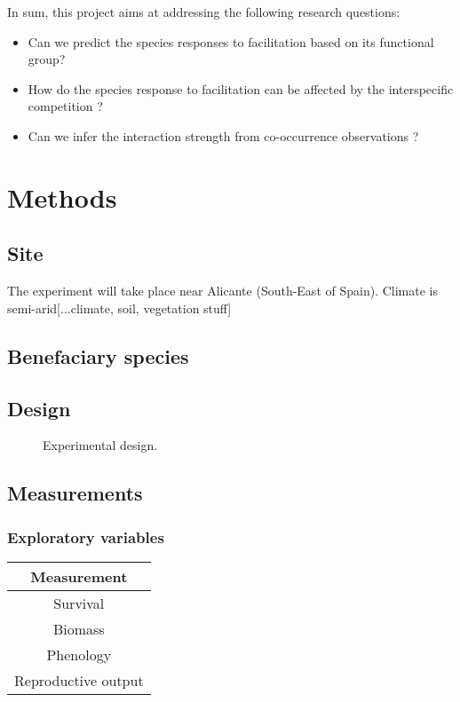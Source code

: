 \documentclass[12pt, a4paper]{article} %
\begin{document}
In sum, this project aims at addressing the following research questions:
\begin{itemize}
	\item Can we predict the species responses to facilitation based on its functional group? 
	\item How do the species response to facilitation can be affected by the interspecific competition ?
	\item Can we infer the interaction strength from co-occurrence observations ?
\end{itemize}


\section{Methods}
\subsection{Site}
The experiment will take place near Alicante (South-East of Spain). Climate is semi-arid[...climate, soil, vegetation stuff]

\subsection{Benefaciary species}

\subsection{Design}

\begin{figure} %
\begin{center}
\end{center}
\caption{Experimental design.\label{exp}}
\end{figure}

\subsection{Measurements}
\subsubsection{Exploratory variables}
\begin{table}[h]
\begin{center}
\begin{tabular}{c}
Measurement \\ 
\hline
Survival \\ 
Biomass \\ 
Phenology \\ 
Reproductive output \\
\hline 
\end{tabular}
\end{center}
\end{table} 
\end{document}
